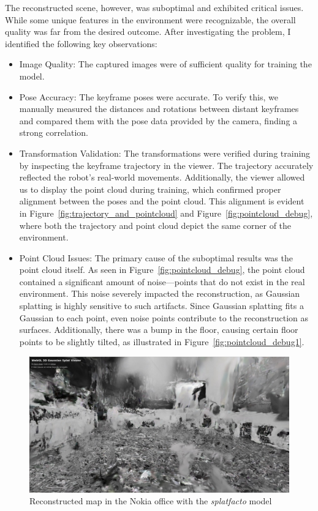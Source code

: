 The reconstructed scene, however, was suboptimal and exhibited critical issues. While some unique features in the environment were recognizable, the overall quality was far from the desired outcome. After investigating the problem, I identified the following key observations:

\begin{itemize}
    \item Image Quality: The captured images were of sufficient quality for training the model.
    \item Pose Accuracy: The keyframe poses were accurate. To verify this, we manually measured the distances and rotations between distant keyframes and compared them with the pose data provided by the camera, finding a strong correlation.
    \item Transformation Validation: The transformations were verified during training by inspecting the keyframe trajectory in the viewer. The trajectory accurately reflected the robot's real-world movements. Additionally, the viewer allowed us to display the point cloud during training, which confirmed proper alignment between the poses and the point cloud. This alignment is evident in Figure~\ref{fig:trajectory_and_pointcloud} and Figure~\ref{fig:pointcloud_debug}, where both the trajectory and point cloud depict the same corner of the environment.
    \item Point Cloud Issues: The primary cause of the suboptimal results was the point cloud itself. As seen in Figure~\ref{fig:pointcloud_debug}, the point cloud contained a significant amount of noise—points that do not exist in the real environment. This noise severely impacted the reconstruction, as Gaussian splatting is highly sensitive to such artifacts. Since Gaussian splatting fits a Gaussian to each point, even noise points contribute to the reconstruction as surfaces. Additionally, there was a bump in the floor, causing certain floor points to be slightly tilted, as illustrated in Figure~\ref{fig:pointcloud_debug1}.
\end{itemize}

\begin{figure}[htbp]
	\centering
	\includegraphics[width=150mm, keepaspectratio]{figures_jpg/nokia_splatfacto_ours1.jpg}
	\caption{Reconstructed map in the Nokia office with the \textit{splatfacto} model}
	\label{fig:nokia_splatfacto_ours_1}
\end{figure}

